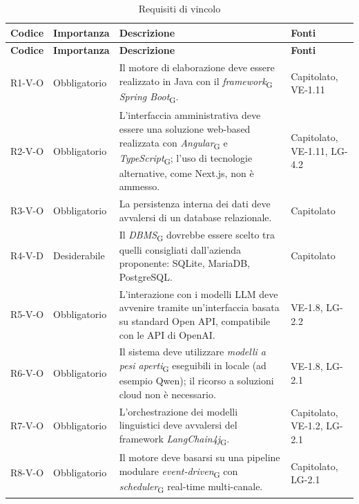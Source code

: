{
    \small
    \renewcommand{\arraystretch}{1.3}
    \begin{longtable}{|>{\raggedright\arraybackslash}p{1.8cm}|>{\raggedright\arraybackslash}p{2.3cm}|>{\raggedright\arraybackslash}p{6.6cm}|>{\raggedright\arraybackslash}p{3.1cm}|}
    \caption{Requisiti di vincolo}\label{tab:req-vincolo}\\
    \hline
    \rowcolor[gray]{0.88} \textbf{Codice} & \textbf{Importanza} & \textbf{Descrizione} & \textbf{Fonti} \\ \hline
    \endfirsthead
    \hline
    \rowcolor[gray]{0.88} \textbf{Codice} & \textbf{Importanza} & \textbf{Descrizione} & \textbf{Fonti} \\ \hline
    \endhead
    \mbox{R1-V-O} & Obbligatorio & Il motore di elaborazione deve essere realizzato in Java con il \textit{framework}\textsubscript{G} \textit{Spring Boot}\textsubscript{G}. & \mbox{Capitolato}, \mbox{VE-1.11} \\ \hline
    \mbox{R2-V-O} & Obbligatorio & L'interfaccia amministrativa deve essere una soluzione web-based realizzata con \textit{Angular}\textsubscript{G} e \textit{TypeScript}\textsubscript{G}; l'uso di tecnologie alternative, come Next.js, non è ammesso. & \mbox{Capitolato}, \mbox{VE-1.11}, \mbox{LG-4.2} \\ \hline
    \mbox{R3-V-O} & Obbligatorio & La persistenza interna dei dati deve avvalersi di un database relazionale. & \mbox{Capitolato} \\ \hline
    \mbox{R4-V-D} & Desiderabile & Il \textit{DBMS}\textsubscript{G} dovrebbe essere scelto tra quelli consigliati dall'azienda proponente: SQLite, MariaDB, PostgreSQL. & \mbox{Capitolato} \\ \hline
    \mbox{R5-V-O} & Obbligatorio & L'interazione con i modelli LLM deve avvenire tramite un'interfaccia basata su standard Open API, compatibile con le API di OpenAI. & \mbox{VE-1.8}, \mbox{LG-2.2} \\ \hline
    \mbox{R6-V-O} & Obbligatorio & Il sistema deve utilizzare \textit{modelli a pesi aperti}\textsubscript{G} eseguibili in locale (ad esempio Qwen); il ricorso a soluzioni cloud non è necessario. & \mbox{VE-1.8}, \mbox{LG-2.1} \\ \hline
    \mbox{R7-V-O} & Obbligatorio & L'orchestrazione dei modelli linguistici deve avvalersi del framework \textit{LangChain4j}\textsubscript{G}. & \mbox{Capitolato}, \mbox{VE-1.2}, \mbox{LG-2.1} \\ \hline
    \mbox{R8-V-O} & Obbligatorio & Il motore deve basarsi su una pipeline modulare \textit{event-driven}\textsubscript{G} con \textit{scheduler}\textsubscript{G} real-time multi-canale. & \mbox{Capitolato}, \mbox{LG-2.1} \\ \hline

\end{longtable}}
